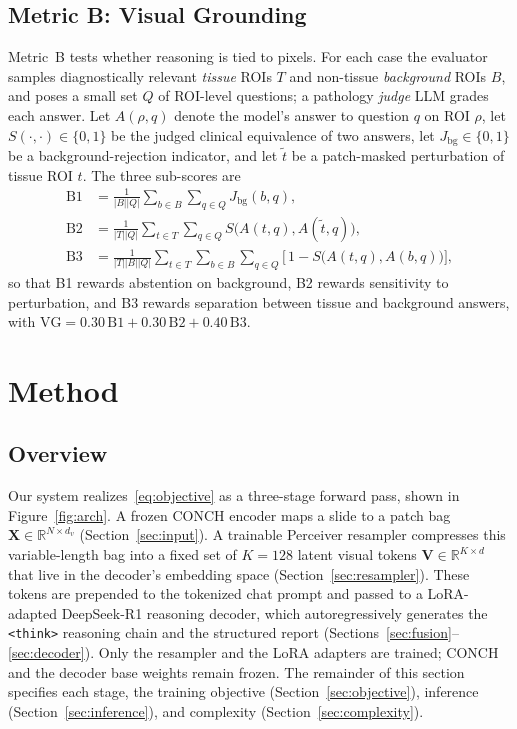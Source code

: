 \documentclass[11pt]{article}
\newcommand{\code}[1]{\texttt{\small #1}}
\newcommand{\R}{\mathbb{R}}
\newcommand{\Xbag}{\mathbf{X}}
\newcommand{\Vvis}{\mathbf{V}}
\begin{document}
\subsection{Metric B: Visual Grounding}
Metric~B tests whether reasoning is tied to pixels. For each case the evaluator
samples diagnostically relevant \emph{tissue} ROIs $T$ and non-tissue
\emph{background} ROIs $B$, and poses a small set $Q$ of ROI-level questions; a
pathology \emph{judge} LLM grades each answer. Let $A(\rho,q)$ denote the model's
answer to question $q$ on ROI $\rho$, let $S(\cdot,\cdot)\in\{0,1\}$ be the
judged clinical equivalence of two answers, let $J_{\text{bg}}\in\{0,1\}$ be a
background-rejection indicator, and let $\tilde t$ be a patch-masked perturbation
of tissue ROI $t$. The three sub-scores are
\begin{align}
\mathrm{B1}&=\frac{1}{|B||Q|}\sum_{b\in B}\sum_{q\in Q} J_{\text{bg}}(b,q),\\
\mathrm{B2}&=\frac{1}{|T||Q|}\sum_{t\in T}\sum_{q\in Q} S\!\big(A(t,q),A(\tilde t,q)\big),\\
\mathrm{B3}&=\frac{1}{|T||B||Q|}\sum_{t\in T}\sum_{b\in B}\sum_{q\in Q}\big[\,1-S\!\big(A(t,q),A(b,q)\big)\big],
\end{align}
so that B1 rewards abstention on background, B2 rewards sensitivity to
perturbation, and B3 rewards separation between tissue and background answers,
with $\mathrm{VG}=0.30\,\mathrm{B1}+0.30\,\mathrm{B2}+0.40\,\mathrm{B3}$.

\section{Method}
\label{sec:methods}
\subsection{Overview}
Our system realizes~\eqref{eq:objective} as a three-stage forward pass, shown in
Figure~\ref{fig:arch}. A frozen CONCH encoder maps a slide to a patch bag
$\Xbag\in\R^{N\times d_v}$ (Section~\ref{sec:input}). A trainable Perceiver
resampler compresses this variable-length bag into a fixed set of $K{=}128$
latent visual tokens $\Vvis\in\R^{K\times d}$ that live in the decoder's
embedding space (Section~\ref{sec:resampler}). These tokens are prepended to the
tokenized chat prompt and passed to a LoRA-adapted DeepSeek-R1 reasoning decoder,
which autoregressively generates the \code{<think>} reasoning chain and the
structured report (Sections~\ref{sec:fusion}--\ref{sec:decoder}). Only the
resampler and the LoRA adapters are trained; CONCH and the decoder base weights
remain frozen. The remainder of this section specifies each stage, the training
objective (Section~\ref{sec:objective}), inference (Section~\ref{sec:inference}),
and complexity (Section~\ref{sec:complexity}).
\end{document}
